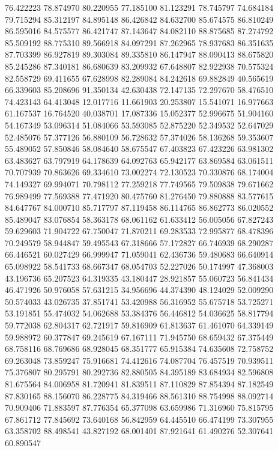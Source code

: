 76.422223
78.874970
80.220955
77.185100
81.123291
78.745797
74.684184
79.715294
85.312197
84.895148
86.426842
84.632700
85.674575
86.810249
86.595016
84.575577
86.421747
87.143647
84.082110
88.875685
87.274792
85.509192
88.775310
89.566918
84.097291
87.262965
78.937683
86.351635
87.703399
86.927819
89.303084
89.335810
86.147947
88.090413
88.675820
85.245286
87.340181
86.680639
83.209932
67.648807
82.922938
70.575324
82.558729
69.411655
67.628998
82.289084
84.242618
69.882849
40.565619
66.339603
85.208696
91.350134
42.630438
72.147135
72.297670
58.476510
74.423143
64.413048
12.017716
11.661903
20.253807
15.541071
16.977663
61.167537
16.764520
40.038701
17.087336
15.052377
52.996675
51.904160
54.167349
53.096314
51.084066
53.593085
52.875220
52.349532
52.647029
52.485076
57.377126
56.880109
56.728632
57.374026
58.136268
59.353607
55.489052
57.850846
58.084640
58.675547
67.403823
67.423226
63.981302
63.483627
63.797919
64.178639
64.092763
65.942177
63.869584
63.061511
70.707939
70.863626
69.334610
73.002274
72.130523
70.330876
68.174004
74.149327
69.994071
70.798112
77.259218
77.749565
79.509838
79.671662
76.989499
77.569388
77.471920
80.475760
81.276450
79.880888
83.577615
84.647767
84.000710
85.717797
87.119458
86.114765
86.862773
86.020552
85.489047
83.076854
58.363178
68.061162
61.633412
56.005056
67.827243
59.629603
71.904722
67.750047
71.870211
69.283533
72.995877
68.478396
70.249579
58.944847
59.495543
67.318666
57.172827
66.746939
68.290287
66.446521
60.027429
66.999947
71.059041
62.436736
59.480683
66.640914
65.098922
58.541733
68.667347
68.054703
52.227026
50.174997
47.368003
43.196736
65.207523
64.319335
43.180447
28.921857
55.060723
56.841434
46.471926
50.976058
57.631215
34.956696
44.374390
48.124029
52.009290
50.574033
43.026735
37.851741
53.420988
56.316952
55.675718
53.725271
53.191851
55.474032
54.062688
53.384376
56.446812
54.036625
58.817794
59.772038
62.804317
62.721917
59.816909
61.813637
61.461070
64.339149
59.988972
60.377847
69.245619
67.167111
71.945750
68.659432
67.375449
68.758116
68.769686
68.928045
68.351777
65.915384
74.635608
72.758752
69.263048
73.859247
75.916681
74.412616
74.087704
76.457519
70.939511
75.376807
80.295791
80.292736
82.880505
84.395189
83.684934
82.596808
81.675564
84.006958
81.720941
81.839511
87.110829
87.854394
87.182549
87.830165
88.156070
86.228775
84.319466
88.561310
88.754998
88.092714
70.909406
71.883597
87.776354
65.377098
63.659986
71.316960
75.815795
67.861712
77.845692
73.640168
56.842959
64.445510
66.474199
73.307955
63.358702
88.498541
43.827192
68.001401
87.921641
61.490276
52.307641
60.890547
